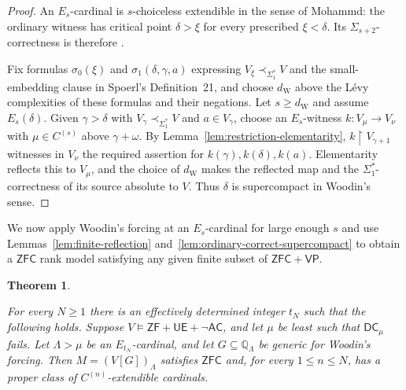 \documentclass[11pt,a4paper]{amsart}
\newcommand{\VP}{\mathsf{VP}}
\newcommand{\AC}{\mathsf{AC}}
\newcommand{\ZF}{\mathsf{ZF}}
\newcommand{\ZFC}{\mathsf{ZFC}}
\newcommand{\restr}{\mathbin{\upharpoonright}}
\newcommand{\DC}{\mathsf{DC}}
\newcommand{\UE}{\mathsf{UE}}
\theoremstyle{plain}
\newtheorem{theorem}{Theorem}[section]
\theoremstyle{definition}
\theoremstyle{remark}
\begin{document}
\begin{proof}
An $E_s$-cardinal is $s$-choiceless extendible in the sense of Mohammd: the ordinary witness has critical point $\delta>\xi$ for every prescribed $\xi<\delta$.  Its $\Sigma_{s+2}$-correctness is therefore \cite[Proposition~2.2]{Mohammd}.

Fix formulas $\sigma_0(\xi)$ and $\sigma_1(\delta,\gamma,a)$ expressing $V_\xi\prec_{\Sigma_1^*}V$ and the small-embedding clause in Spoerl's Definition~21, and choose $d_{\mathrm W}$ above the L\'evy complexities of these formulas and their negations.  Let $s\geq d_{\mathrm W}$ and assume $E_s(\delta)$.  Given $\gamma>\delta$ with $V_\gamma\prec_{\Sigma_1^*}V$ and $a\in V_\gamma$, choose an $E_s$-witness $k:V_\mu\to V_\nu$ with $\mu\in C^{(s)}$ above $\gamma+\omega$.  By Lemma~\ref{lem:restriction-elementarity}, $k\restr V_{\gamma+1}$ witnesses in $V_\nu$ the required assertion for $k(\gamma),k(\delta),k(a)$.  Elementarity reflects this to $V_\mu$, and the choice of $d_{\mathrm W}$ makes the reflected map and the $\Sigma_1^*$-correctness of its source absolute to $V$.  Thus $\delta$ is supercompact in Woodin's sense.
\end{proof}

We now apply Woodin's forcing at an $E_s$-cardinal for large enough $s$ and use Lemmas~\ref{lem:finite-reflection} and~\ref{lem:ordinary-correct-supercompact} to obtain a $\ZFC$ rank model satisfying any given finite subset of $\ZFC+\VP$.

\begin{theorem}\label{thm:finite-restoration}

For every $N\geq1$ there is an effectively determined integer $t_N$ such that the following holds.  Suppose $V\models\ZF+\UE+\neg\AC$, and let $\mu$ be least such that $\DC_\mu$ fails.  Let $\Lambda>\mu$ be an $E_{t_N}$-cardinal, and let $G\subseteq\mathbb Q_\Lambda$ be generic for Woodin's forcing.  Then $M=(V[G])_\Lambda$ satisfies $\ZFC$ and, for every $1\leq n\leq N$, has a proper class of $C^{(n)}$-extendible cardinals.
\end{theorem}
\end{document}
